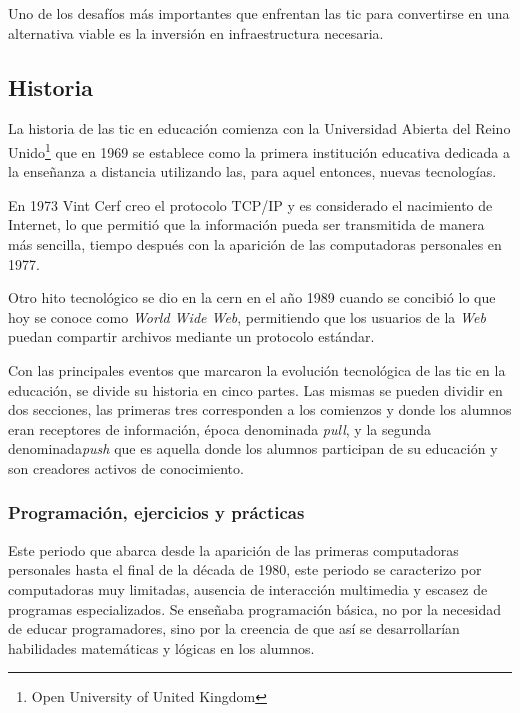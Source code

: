Uno de los desafíos más importantes que enfrentan las \Gls{tic} para convertirse
en una alternativa viable es la inversión en infraestructura
necesaria\cite{unesco:ict}. 

\subsection{Historia}

La historia de las \Gls{tic} en educación comienza con la Universidad Abierta
del Reino Unido\footnote{Open University of United Kingdom} que en 1969 se
establece como la primera institución educativa dedicada a la enseñanza a
distancia utilizando las, para aquel entonces, nuevas
tecnologías\cite{tinio:ict}.

En 1973 Vint Cerf creo el protocolo TCP/IP y es considerado el nacimiento de
Internet\cite{white:ict}, lo que permitió que la información pueda ser
transmitida de manera más sencilla, tiempo después con la aparición de las
computadoras personales en 1977\cite{white:ict}. 

Otro hito tecnológico se dio en la \Gls{cern} en el año 1989 cuando se concibió
lo que hoy se conoce como \emph{World Wide Web}, permitiendo que los usuarios de
la \emph{Web} puedan compartir archivos mediante un protocolo
estándar\cite{white:ict}. 

Con las principales eventos que marcaron la evolución tecnológica de las
\Gls{tic} en la educación, se divide su historia en cinco partes. Las mismas se
pueden dividir en dos secciones, las primeras tres corresponden a los comienzos
y donde los alumnos eran receptores de información, época denominada
\emph{pull}, y la segunda denominada\emph{push}\cite{white:ict} que es aquella
donde los alumnos participan de su educación y son creadores activos de
conocimiento.

\subsubsection{Programación, ejercicios y prácticas}

Este periodo que abarca desde la aparición de las primeras computadoras
personales hasta el final de la década de 1980, este periodo se caracterizo por
computadoras muy limitadas, ausencia de interacción multimedia y escasez de
programas especializados. Se enseñaba programación básica\cite{leinonen:ict}, no
por la necesidad de educar programadores, sino por la creencia de que así se
desarrollarían habilidades matemáticas y lógicas en los alumnos. 


